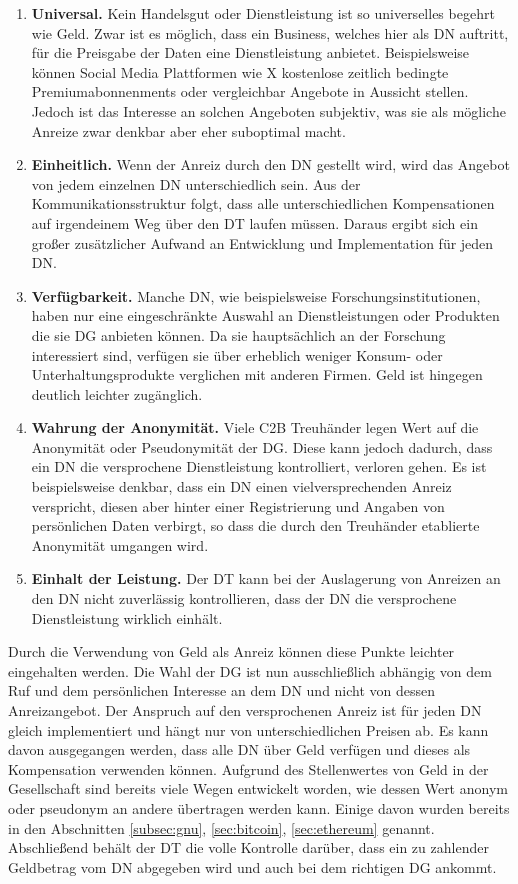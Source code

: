 \documentclass[
	fontsize=11pt,
	headings=small,
	parskip=half,           %
	bibliography=totoc,
	numbers=noenddot,       %
	open=any,               %
]{scrreprt}
\begin{document}
\begin{enumerate}
    \item \textbf{Universal.} Kein Handelsgut oder Dienstleistung ist so universelles begehrt wie Geld. Zwar ist es möglich, dass ein Business, welches hier als DN auftritt, für die Preisgabe der Daten eine Dienstleistung anbietet. Beispielsweise können Social Media Plattformen wie X kostenlose zeitlich bedingte Premiumabonnenments oder vergleichbar Angebote in Aussicht stellen. Jedoch ist das Interesse an solchen Angeboten subjektiv, was sie als mögliche Anreize zwar denkbar aber eher suboptimal macht.
    \item \textbf{Einheitlich.} Wenn der Anreiz durch den DN gestellt wird, wird das Angebot von jedem einzelnen DN unterschiedlich sein. Aus der Kommunikationsstruktur folgt, dass alle unterschiedlichen Kompensationen auf irgendeinem Weg über den DT laufen müssen. Daraus ergibt sich ein großer zusätzlicher Aufwand an Entwicklung und Implementation für jeden DN.
    \item \textbf{Verfügbarkeit.} Manche DN, wie beispielsweise Forschungsinstitutionen, haben nur eine eingeschränkte Auswahl an Dienstleistungen oder Produkten die sie DG anbieten können. Da sie hauptsächlich an der Forschung interessiert sind, verfügen sie über erheblich weniger Konsum- oder Unterhaltungsprodukte verglichen mit anderen Firmen. Geld ist hingegen deutlich leichter zugänglich.
    \item \textbf{Wahrung der Anonymität.} Viele C2B Treuhänder legen Wert auf die Anonymität oder Pseudonymität der DG. Diese kann jedoch dadurch, dass ein DN die versprochene Dienstleistung kontrolliert, verloren gehen. Es ist beispielsweise denkbar, dass ein DN einen vielversprechenden Anreiz verspricht, diesen aber hinter einer Registrierung und Angaben von persönlichen Daten verbirgt, so dass die durch den Treuhänder etablierte Anonymität umgangen wird.
    \item \textbf{Einhalt der Leistung.} Der DT kann bei der Auslagerung von Anreizen an den DN nicht zuverlässig kontrollieren, dass der DN die versprochene Dienstleistung wirklich einhält.
\end{enumerate}
Durch die Verwendung von Geld als Anreiz können diese Punkte leichter eingehalten werden. Die Wahl der DG ist nun ausschließlich abhängig von dem Ruf und dem persönlichen Interesse an dem DN und nicht von dessen Anreizangebot. Der Anspruch auf den versprochenen Anreiz ist für jeden DN gleich implementiert und hängt nur von unterschiedlichen Preisen ab. Es kann davon ausgegangen werden, dass alle DN über Geld verfügen und dieses als Kompensation verwenden können. Aufgrund des Stellenwertes von Geld in der Gesellschaft sind bereits viele Wegen entwickelt worden, wie dessen Wert anonym oder pseudonym an andere übertragen werden kann. Einige davon wurden bereits in den Abschnitten \ref{subsec:gnu}, \ref{sec:bitcoin}, \ref{sec:ethereum} genannt. Abschließend behält der DT die volle Kontrolle darüber, dass ein zu zahlender Geldbetrag vom DN abgegeben wird und auch bei dem richtigen DG ankommt.
\end{document}
